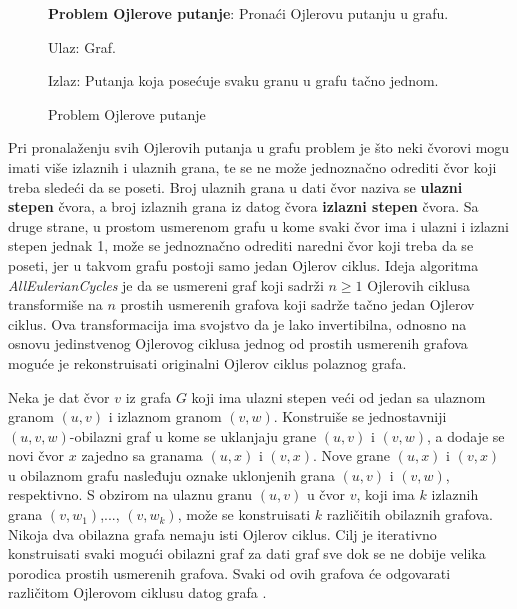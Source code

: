 \documentclass[12pt,oneside]{memoir}
\begin{document}
\begin{figure}[!ht]
\begin{tcolorbox}
\textbf{Problem Ojlerove putanje}: Pronaći Ojlerovu putanju u grafu.

Ulaz: Graf.

Izlaz: Putanja koja posećuje svaku granu u grafu tačno jednom.
\end{tcolorbox}
\caption{Problem Ojlerove putanje}
\label{box:Ojler}
\end{figure}

Pri pronalaženju svih Ojlerovih putanja u grafu problem je što neki čvorovi mogu imati više izlaznih i ulaznih grana, te se ne može jednoznačno odrediti čvor koji treba sledeći da se poseti. Broj ulaznih grana u dati čvor naziva se \textbf{ulazni stepen} čvora, a broj izlaznih grana iz datog čvora \textbf{izlazni stepen} čvora. Sa druge strane, u prostom usmerenom grafu u kome svaki čvor ima i ulazni i izlazni stepen jednak 1, može se jednoznačno odrediti naredni čvor koji treba da se poseti, jer u takvom grafu postoji samo jedan Ojlerov ciklus. Ideja algoritma \textit{AllEulerianCycles} je da se usmereni graf koji sadrži $n \geq 1$ Ojlerovih ciklusa transformiše na $n$ prostih usmerenih grafova koji sadrže tačno jedan Ojlerov ciklus. Ova transformacija ima svojstvo da je lako invertibilna, odnosno na osnovu jedinstvenog Ojlerovog ciklusa jednog od prostih usmerenih grafova moguće je rekonstruisati originalni Ojlerov ciklus polaznog grafa.

Neka je dat čvor $v$ iz grafa $G$ koji ima ulazni stepen veći od jedan sa ulaznom granom $(u, v)$ i izlaznom granom $(v, w)$. Konstruiše se jednostavniji $(u, v, w)$-obilazni graf u kome se uklanjaju grane $(u, v)$ i $(v, w)$, a dodaje se novi čvor $x$ zajedno sa granama $(u, x)$ i $(v, x)$. Nove grane $(u, x)$ i $(v, x)$ u obilaznom grafu nasleđuju oznake uklonjenih grana $(u, v)$ i $(v, w)$, respektivno. S obzirom na ulaznu granu $(u, v)$ u čvor $v$, koji ima $k$ izlaznih grana $(v, w_1)$,..., $(v, w_k)$, može se konstruisati $k$ različitih obilaznih grafova. Nikoja dva obilazna grafa nemaju isti Ojlerov ciklus. Cilj je iterativno konstruisati svaki mogući obilazni graf za dati graf sve dok se ne dobije velika porodica prostih usmerenih grafova. Svaki od ovih grafova će odgovarati različitom Ojlerovom ciklusu datog grafa \cite{bioinformaticsAlg}.
\end{document}
